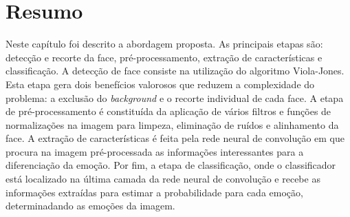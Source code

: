 \section{Resumo}\label{sec:considfi}
Neste capítulo foi descrito a abordagem proposta. As principais etapas são: detecção e recorte da face, pré-processamento, extração de características e classificação. A detecção de face consiste na utilização do algoritmo Viola-Jones. Esta etapa gera dois benefícios valorosos que reduzem a complexidade do problema: a exclusão do \textit{background} e o recorte individual de cada face. A etapa de pré-processamento é constituída da aplicação de vários filtros e funções de normalizações na imagem para limpeza, eliminação de ruídos e alinhamento da face. A extração de características é feita pela rede neural de convolução em que procura na imagem pré-processada as informações interessantes para a diferenciação da emoção. Por fim, a etapa de classificação, onde o classificador está localizado na última camada da rede neural de convolução e recebe as informações extraídas para estimar a probabilidade para cada emoção, determinadando as emoções da imagem.      